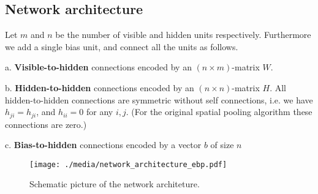 \documentclass[titlepage]{amsart}
\theoremstyle{definition}
\begin{document}
\subsection{Network architecture}
% 
% 
Let $m$ and $n$ be the number of visible and hidden units respectively. 
Furthermore we add a single bias unit, and connect all the units as follows. 
\begin{list}{}{}
\item[a.] \textbf{Visible-to-hidden} connections encoded by an $(n \times m)$-matrix $W$.
\item[b.] \textbf{Hidden-to-hidden} connections encoded by an $(n \times n)$-matrix $H$. 
          All hidden-to-hidden connections are symmetric without self connections,
          i.e. we have $h_{ji} = h_{ji}$, and $h_{ii} = 0$ for any $i,j$.
          (For the original spatial pooling algorithm these connections are zero.)
\item[c.] \textbf{Bias-to-hidden} connections encoded by a vector $b$ of size $n$ 
\end{list}
% 
\begin{figure}[h]
\texttt{[image: ./media/network\_architecture\_ebp.pdf]}
\caption{Schematic picture of the network architeture.}
 \label{fig:network connections}
\end{figure}
% 
% 
\end{document}
